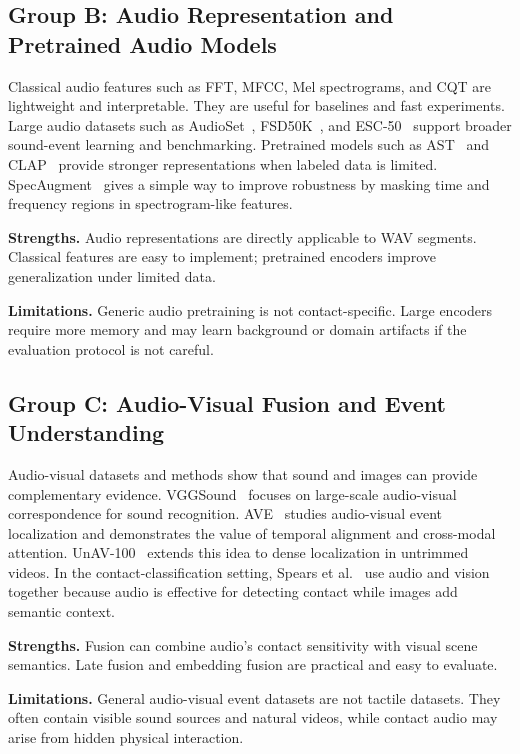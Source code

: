 \documentclass[12pt,a4paper]{article}
\begin{document}
\subsection{Group B: Audio Representation and Pretrained Audio Models}

Classical audio features such as FFT, MFCC, Mel spectrograms, and CQT are lightweight and interpretable. They are useful for baselines and fast experiments. Large audio datasets such as AudioSet~\cite{gemmeke2017audioset}, FSD50K~\cite{fonseca2020fsd50k}, and ESC-50~\cite{piczak2015esc50} support broader sound-event learning and benchmarking. Pretrained models such as AST~\cite{gong2021ast} and CLAP~\cite{elizalde2022clap} provide stronger representations when labeled data is limited. SpecAugment~\cite{park2019specaugment} gives a simple way to improve robustness by masking time and frequency regions in spectrogram-like features.

\textbf{Strengths.} Audio representations are directly applicable to WAV segments. Classical features are easy to implement; pretrained encoders improve generalization under limited data.

\textbf{Limitations.} Generic audio pretraining is not contact-specific. Large encoders require more memory and may learn background or domain artifacts if the evaluation protocol is not careful.

\subsection{Group C: Audio-Visual Fusion and Event Understanding}

Audio-visual datasets and methods show that sound and images can provide complementary evidence. VGGSound~\cite{chen2020vggsound} focuses on large-scale audio-visual correspondence for sound recognition. AVE~\cite{tian2018ave} studies audio-visual event localization and demonstrates the value of temporal alignment and cross-modal attention. UnAV-100~\cite{geng2023unav} extends this idea to dense localization in untrimmed videos. In the contact-classification setting, Spears et al.~\cite{spears2025tree} use audio and vision together because audio is effective for detecting contact while images add semantic context.

\textbf{Strengths.} Fusion can combine audio's contact sensitivity with visual scene semantics. Late fusion and embedding fusion are practical and easy to evaluate.

\textbf{Limitations.} General audio-visual event datasets are not tactile datasets. They often contain visible sound sources and natural videos, while contact audio may arise from hidden physical interaction.
\end{document}
